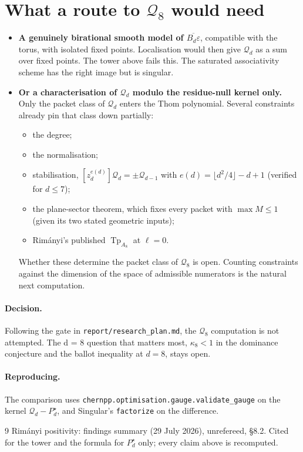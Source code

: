 \documentclass[11pt,a4paper]{article}
\newcommand{\Qd}{\mathcal{Q}}
\DeclareMathOperator{\Tp}{Tp}
\theoremstyle{plain}
\begin{document}
\section{What a route to $\Qd_8$ would need}

\begin{itemize}[nosep]
\item \textbf{A genuinely birational smooth model of $\overline{B_d\varepsilon}$}, compatible
  with the torus, with isolated fixed points. Localisation would then give $\Qd_d$ as a sum over
  fixed points. The tower above fails this. The saturated associativity scheme has the right
  image but is singular.
\item \textbf{Or a characterisation of $\Qd_d$ modulo the residue-null kernel only.} Only the
  packet class of $\Qd_d$ enters the Thom polynomial. Several constraints already pin that class
  down partially:
  \begin{itemize}[nosep]
  \item the degree;
  \item the normalisation;
  \item stabilisation, $[z_d^{e(d)}]\Qd_d = \pm \Qd_{d-1}$ with $e(d) = \lfloor d^2/4 \rfloor - d + 1$
    (verified for $d \le 7$);
  \item the plane-sector theorem, which fixes every packet with $\max M \le 1$ (given its two
    stated geometric inputs);
  \item Rim\'anyi's published $\Tp_{A_8}$ at $\ell = 0$.
  \end{itemize}
  Whether these determine the packet class of $\Qd_8$ is open. Counting constraints against the
  dimension of the space of admissible numerators is the natural next computation.
\end{itemize}

\paragraph{Decision.} Following the gate in \texttt{report/research\_plan.md}, the $\Qd_8$ computation
is not attempted. The d = 8 question that matters most, $\kappa_8 < 1$ in the dominance conjecture
and the ballot inequality at $d = 8$, stays open.

\paragraph{Reproducing.} The comparison uses \texttt{chernpp.optimisation.gauge.validate\_gauge} on
the kernel $\Qd_d - P^\star_d$, and Singular's \texttt{factorize} on the difference.

\begin{thebibliography}{9}
 Rim\'anyi positivity: findings summary (29 July 2026), unrefereed, \S8.2. Cited for the tower and the formula for $P^\star_d$ only; every claim above is recomputed.
\end{thebibliography}
\end{document}
